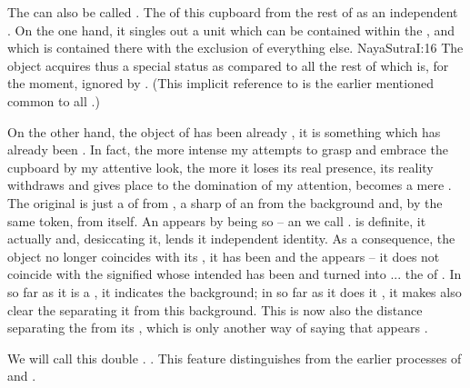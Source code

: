 \pa\label{pa:doubleSep}\label{pa:Rexternal} The  can
also be called .  The  of 
 this cupboard from the rest of  as an
independent . On the one hand, it singles out a unit which can be
contained within the \hoa, and which is contained there with the exclusion of
everything else.  \citet{The mark of the mind is that there do not arise more
  acts of knowledge than one at a
  time.}{NayaSutra}{I:16\label{ftnt:mark}} The object acquires thus
a special status as compared to all the rest of  which is, for
the moment, ignored by .  (This implicit reference to  is the earlier mentioned  common to all
.)

On the other hand, the object of  has been already
, it is something which has already been .  In
fact, the more intense my attempts to grasp and embrace the cupboard by my
attentive look, the more it loses its real presence, its reality withdraws and
gives place to the domination of my  attention, becomes a mere
.  The original  is just a
 of  from , a sharp
 of an  from the background and, by the same token,
from itself.  An  appears by being so  -- an 
we call .  is definite, it actually
 and, desiccating it, lends it independent
identity. As a consequence, the object no longer coincides with its , it
has been  and the  appears  -- it does
not coincide with the signified whose intended  has been
 and turned into ... the  of .  In so
far as it is a , it indicates the background; in so far as it does it
, it makes also clear the  separating it from this
background. This  is now also the distance separating the
 from its ,
which is only another way of saying that  appears .

We will call this double  .
 . This feature
distinguishes  from the earlier processes of  and
.


